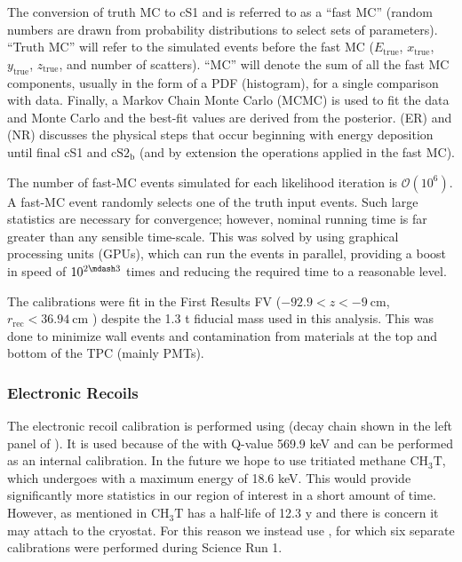 The conversion of truth MC to cS1 and \cstwob is referred to as a ``fast MC'' (random numbers are drawn from probability distributions to
select sets of parameters).  ``Truth MC'' will refer to the simulated events before the fast MC ($E_{\mathrm{true}}$,
$x_{\mathrm{true}}$, $y_{\mathrm{true}}$, $z_{\mathrm{true}}$, and number
of scatters).  ``MC'' will denote the sum of all the fast MC components, usually in the form of a PDF (histogram), for
a single comparison with data.  Finally, a Markov Chain Monte Carlo (MCMC) is used to fit the data and Monte Carlo and the best-fit values
are derived from the posterior.   (ER) and
 (NR) discusses the physical steps that occur beginning with energy
deposition until final cS1 and $\mathrm{cS2_b}$ (and by extension the operations applied in the fast MC).

The number of fast-MC events simulated for each likelihood iteration is $\mathcal{O}(10^6)$.  A fast-MC event randomly selects one of the
truth input events.  Such large statistics are necessary for
convergence;
however, nominal running time is far greater than any sensible time-scale.  This was solved by using graphical processing units (GPUs),
which can run the events in parallel, providing a boost in speed of $10^{2 \mdash 3}$ times and reducing the required time to a
reasonable level.

The calibrations were fit in the First Results FV ($-92.9 < z < -9\ \mathrm{cm}$, $r_{\mathrm{rec}} < 36.94\ \mathrm{cm}$
) despite the 1.3 t fiducial mass used in this analysis.  This was done to minimize wall
events and contamination from materials at the top and bottom of the TPC (mainly PMTs).



\subsubsection{Electronic Recoils}
\label{subsubsec:er_nr_calibrations_parameter_determ_er}
The electronic recoil calibration is performed using  (decay chain shown in the left panel of
).  It is used because of the  \betadecay with Q-value 569.9 keV and can be performed
as an internal calibration.  In the future we hope to use tritiated methane $\mathrm{C H_3 T}$, which undergoes \betadecay
with a maximum energy of 18.6 keV.  This would provide significantly more statistics in our region of interest in a short amount
of time.  However, as mentioned in  $\mathrm{C H_3 T}$ has a half-life of 12.3 y and there
is concern it may attach to the cryostat.  For this reason we instead use , for which six separate calibrations were
performed during Science Run 1.

